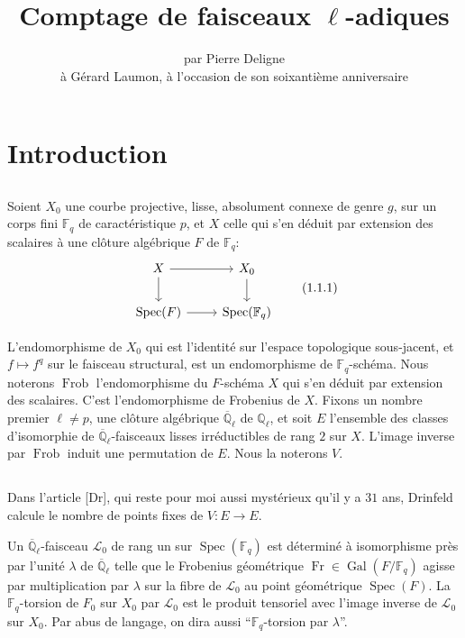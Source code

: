 \documentclass[11pt,a4paper]{article}
\title{\textbf{Comptage de faisceaux $\ell$-adiques}}
\author{par Pierre Deligne\\[.5em]
\small \`a G\'erard Laumon, \`a l'occasion de son soixanti\`eme anniversaire}
\date{}
\theoremstyle{plain}
\theoremstyle{definition}
\DeclareMathOperator{\Spec}{Spec}
\DeclareMathOperator{\Gal}{Gal}
\DeclareMathOperator{\Frob}{Frob}
\DeclareMathOperator{\Fr}{Fr}
\newcommand{\Q}{\mathbb{Q}}
\newcommand{\F}{\mathbb{F}}
\newcommand{\Ql}{\overline{\mathbb{Q}}_\ell}
\begin{document}
\maketitle

\section{Introduction}

\subsection{}
Soient $X_0$ une courbe projective, lisse, absolument connexe de genre $g$, sur un corps fini $\F_q$ de caract\'eristique $p$, et $X$ celle qui s'en d\'eduit par extension des scalaires \`a une cl\^oture alg\'ebrique $F$ de $\F_q$:
\begin{equation}
\begin{tikzcd}
X \arrow[r] \arrow[d] & X_0 \arrow[d] \\
\Spec(F) \arrow[r] & \Spec(\F_q)
\end{tikzcd}
\tag{1.1.1}
\end{equation}

L'endomorphisme de $X_0$ qui est l'identit\'e sur l'espace topologique sous-jacent, et $f \mapsto f^q$ sur le faisceau structural, est un endomorphisme de $\F_q$-sch\'ema. Nous noterons $\Frob$ l'endomorphisme du $F$-sch\'ema $X$ qui s'en d\'eduit par extension des scalaires. C'est l'endomorphisme de Frobenius de $X$. Fixons un nombre premier $\ell \neq p$, une cl\^oture alg\'ebrique $\Ql$ de $\Q_\ell$, et soit $E$ l'ensemble des classes d'isomorphie de $\Ql$-faisceaux lisses irr\'eductibles de rang $2$ sur $X$. L'image inverse par $\Frob$ induit une permutation de $E$. Nous la noterons $V$.

\subsection{}
Dans l'article [Dr], qui reste pour moi aussi myst\'erieux qu'il y a $31$ ans, Drinfeld calcule le nombre de points fixes de $V: E \to E$.

Un $\Ql$-faisceau $\mathcal{L}_0$ de rang un sur $\Spec(\F_q)$ est d\'etermin\'e \`a isomorphisme pr\`es par l'unit\'e $\lambda$ de $\Ql$ telle que le Frobenius g\'eom\'etrique $\Fr \in \Gal(F/\F_q)$ agisse par multiplication par $\lambda$ sur la fibre de $\mathcal{L}_0$ au point g\'eom\'etrique $\Spec(F)$. La $\F_q$-torsion de $F_0$ sur $X_0$ par $\mathcal{L}_0$ est le produit tensoriel avec l'image inverse de $\mathcal{L}_0$ sur $X_0$. Par abus de langage, on dira aussi ``$\F_q$-torsion par $\lambda$''.
\end{document}
